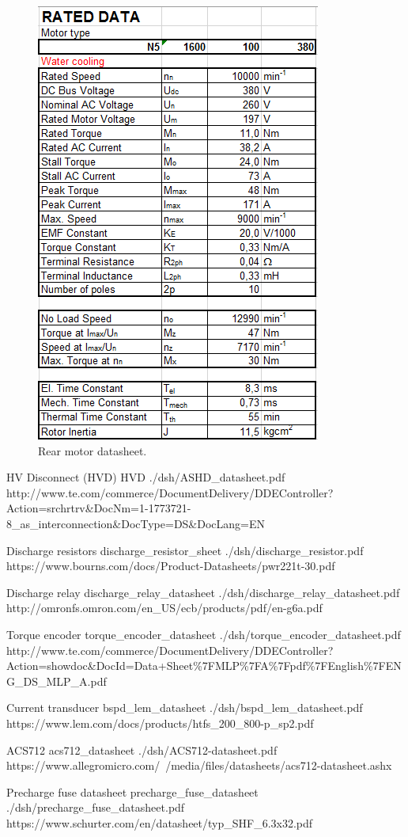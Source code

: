 \begin{figure}[H]
	\centering
	\includegraphics[width=.3\textwidth]{./img/app-mr.png}
	\caption{Rear motor datasheet.}
	\label{app:mr}
\end{figure}



	{HV Disconnect (HVD)}
	{HVD}
	{./dsh/ASHD_datasheet.pdf}
	{http://www.te.com/commerce/DocumentDelivery/DDEController?Action=srchrtrv\&DocNm=1-1773721-8_as_interconnection\&DocType=DS\&DocLang=EN}

	{Discharge resistors}
	{discharge_resistor_sheet}
	{./dsh/discharge_resistor.pdf}
	{https://www.bourns.com/docs/Product-Datasheets/pwr221t-30.pdf}

	{Discharge relay}
	{discharge_relay_datasheet}
	{./dsh/discharge_relay_datasheet.pdf}
	{http://omronfs.omron.com/en_US/ecb/products/pdf/en-g6a.pdf}


	{Torque encoder}
	{torque_encoder_datasheet}
	{./dsh/torque_encoder_datasheet.pdf}
	{http://www.te.com/commerce/DocumentDelivery/DDEController?Action=showdoc\&DocId=Data+Sheet\%7FMLP\%7FA\%7Fpdf\%7FEnglish\%7FENG_DS_MLP_A.pdf}

	{Current transducer}
	{bspd_lem_datasheet}
	{./dsh/bspd_lem_datasheet.pdf}
	{https://www.lem.com/docs/products/htfs_200_800-p_sp2.pdf}

	{ACS712}
	{acs712_datasheet}
	{./dsh/ACS712-datasheet.pdf}
	{https://www.allegromicro.com/~/media/files/datasheets/acs712-datasheet.ashx}

	{Precharge fuse datasheet}
	{precharge_fuse_datasheet}
	{./dsh/precharge_fuse_datasheet.pdf}
	{https://www.schurter.com/en/datasheet/typ_SHF_6.3x32.pdf}

